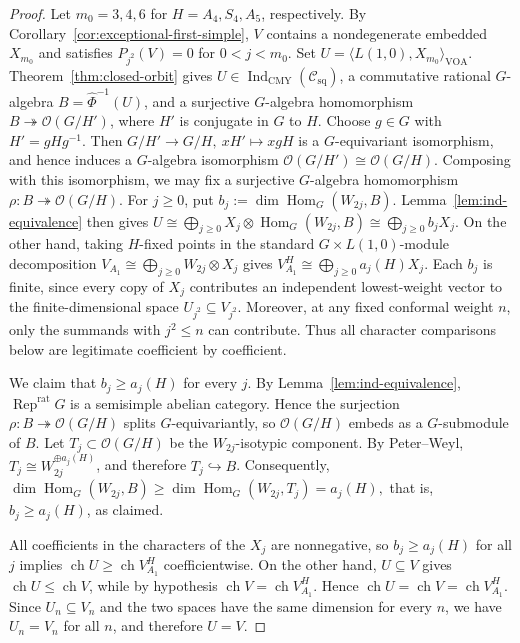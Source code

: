 \documentclass[10pt,a4paper]{amsart}
\numberwithin{equation}{section} \newtheorem{thm}{Theorem}[section] \newtheorem{lem}[thm]{Lemma} \newtheorem{ex}[thm]{Example} \newtheorem{prop}[thm]{Proposition} \newtheorem{cor}[thm]{Corollary} \newtheorem{defi}[thm]{Definition} \newtheorem{rmk}[thm]{Remark} \newtheorem{notation}[thm]{Notation}
\newcommand{\Rep}{\operatorname{Rep}}
\newcommand{\Hom}{\operatorname{Hom}}
\newcommand{\ch}{\operatorname{ch}}
\newcommand{\OO}{\mathcal O}
\newcommand{\Csq}{\mathcal C_{\mathrm{sq}}}
\newcommand{\IndCMY}{\operatorname{Ind}_{\mathrm{CMY}}}
\begin{document}
\begin{proof}
Let $m_0=3,4,6$ for $H=A_4,S_4,A_5$, respectively. By Corollary~\ref{cor:exceptional-first-simple}, $V$ contains a nondegenerate embedded $X_{m_0}$ and satisfies \(P_{j^2}(V)=0\) for $0<j<m_0$. Set \(U=\langle L(1,0),X_{m_0}\rangle_{\mathrm{VOA}}.\) Theorem~\ref{thm:closed-orbit} gives \(U\in\IndCMY(\Csq)\), a commutative rational $G$-algebra \(B=\widehat\Phi^{-1}(U)\), and a surjective $G$-algebra homomorphism \(B\twoheadrightarrow\OO(G/H')\), where $H'$ is conjugate in $G$ to $H$. Choose $g\in G$ with $H'=gHg^{-1}$. Then \(G/H'\to G/H,\ xH'\mapsto xgH\) is a $G$-equivariant isomorphism, and hence induces a $G$-algebra isomorphism \(\OO(G/H')\cong\OO(G/H)\). Composing with this isomorphism, we may fix a surjective $G$-algebra homomorphism \(\rho:B\twoheadrightarrow\OO(G/H).\) For $j\ge0$, put \(b_j:=\dim\Hom_G(W_{2j},B).\) Lemma~\ref{lem:ind-equivalence} then gives \(U\cong\bigoplus_{j\ge0}X_j\otimes\Hom_G(W_{2j},B)\cong\bigoplus_{j\ge0}b_jX_j.\) On the other hand, taking $H$-fixed points in the standard $G\times L(1,0)$-module decomposition \(V_{A_1}\cong\bigoplus_{j\ge0}W_{2j}\otimes X_j\) gives \(V_{A_1}^{H}\cong\bigoplus_{j\ge0}a_j(H)X_j.\) Each $b_j$ is finite, since every copy of $X_j$ contributes an independent lowest-weight vector to the finite-dimensional space $U_{j^2}\subseteq V_{j^2}$. Moreover, at any fixed conformal weight $n$, only the summands with $j^2\le n$ can contribute. Thus all character comparisons below are legitimate coefficient by coefficient.

We claim that \(b_j\ge a_j(H)\) for every $j$. By Lemma~\ref{lem:ind-equivalence}, \(\Rep^{\mathrm{rat}}G\) is a semisimple abelian category. Hence the surjection \(\rho:B\twoheadrightarrow\OO(G/H)\) splits $G$-equivariantly, so \(\OO(G/H)\) embeds as a $G$-submodule of $B$. Let $T_j\subset\OO(G/H)$ be the $W_{2j}$-isotypic component. By Peter--Weyl, \(T_j\cong W_{2j}^{\oplus a_j(H)}\), and therefore \(T_j\hookrightarrow B\). Consequently, \(\dim\Hom_G(W_{2j},B)\ge\dim\Hom_G(W_{2j},T_j)=a_j(H),\) that is, \(b_j\ge a_j(H)\), as claimed.

All coefficients in the characters of the $X_j$ are nonnegative, so \(b_j\ge a_j(H)\) for all $j$ implies \(\ch U\ge\ch V_{A_1}^{H}\) coefficientwise. On the other hand, $U\subseteq V$ gives \(\ch U\le\ch V\), while by hypothesis \(\ch V=\ch V_{A_1}^{H}\). Hence \(\ch U=\ch V=\ch V_{A_1}^{H}.\) Since $U_n\subseteq V_n$ and the two spaces have the same dimension for every $n$, we have $U_n=V_n$ for all $n$, and therefore $U=V$.


\end{proof}
\end{document}
